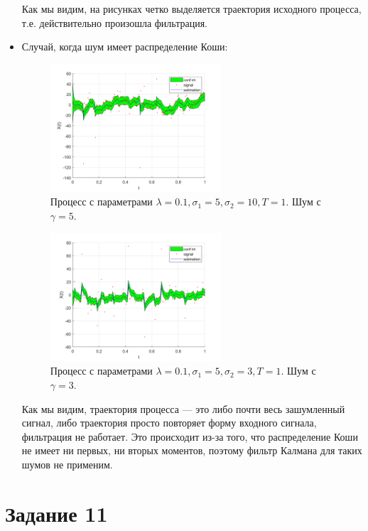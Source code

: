 \documentclass[oneside, final, 12pt]{article}
\begin{document}
\begin{itemize}
				   Как мы видим, на рисунках четко выделяется траектория исходного процесса, т.е. 
				   действительно произошла фильтрация.\newpage
	    \item 	Случай, когда шум имеет распределение Коши:
	    			\begin{figure}[h!]
						\centering
						\includegraphics[width=0.6\textwidth]{../code/Task_10/pict/cauchy_10_5_5_ex.png}
						\caption{Процесс с параметрами $\lambda = 0.1,\sigma_1 = 5,  
										\sigma_2 = 10, T = 1$. Шум с $\gamma = 5$. }
				    \end{figure}
				    \begin{figure}[h!]
						\centering
						\includegraphics[width=0.6\textwidth]{../code/Task_10/pict/cauchy_5_10_3_ex.png}
						\caption{Процесс с параметрами $\lambda = 0.1,\sigma_1 = 5, \sigma_2 = 3, T = 1$. 
											Шум с $\gamma = 3$.}
				    \end{figure}
				    
		
				    Как мы видим, траектория процесса --- это либо почти весь зашумленный сигнал, либо
				   	траектория просто повторяет форму входного сигнала, фильтрация не работает. 
				   	Это происходит из-за того, что распределение Коши не имеет ни первых, 
				    ни вторых моментов, поэтому фильтр Калмана для таких шумов не применим.
	\end{itemize}
\newpage
\section{Задание 11}
\end{document}
